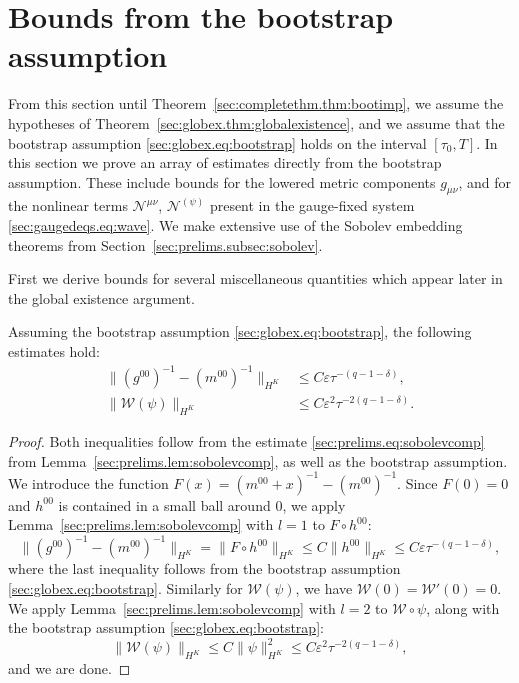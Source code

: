 \documentclass{article}
\newcommand{\mc}{\mathcal}
\newcommand{\ve}{\varepsilon}
\begin{document}
\section{Bounds from the bootstrap assumption}\label{sec:bootbound}
From this section until Theorem~\ref{sec:completethm.thm:bootimp}, we assume the hypotheses of Theorem~\ref{sec:globex.thm:globalexistence}, and we assume that the bootstrap assumption \eqref{sec:globex.eq:bootstrap} holds on the interval $[\tau_0,T]$. In this section we prove an array of estimates directly from the bootstrap assumption. These include bounds for the lowered metric components $g_{\mu\nu}$, and for the nonlinear terms $\mc{N}^{\mu\nu}$, $\mc{N}^{(\psi)}$ present in the gauge-fixed system \eqref{sec:gaugedeqs.eq:wave}. We make extensive use of the Sobolev embedding theorems from Section~\ref{sec:prelims.subsec:sobolev}.

First we derive bounds for several miscellaneous quantities which appear later in the global existence argument.
\begin{lemma}\label{sec:bootbound.lem:miscests}
    Assuming the bootstrap assumption \eqref{sec:globex.eq:bootstrap}, the following estimates hold:
    \begin{align}
        \|(g^{00})^{-1} - (m^{00})^{-1}\|_{H^K} &\leq C\ve\tau^{-(q-1-\delta)},\label{sec:bootbound.eq:miscests1}\\
        \|\mc{W}(\psi)\|_{H^K} &\leq C\ve^2\tau^{-2(q-1-\delta)}.\label{sec:bootbound.eq:miscests2}
    \end{align}
\end{lemma}
\begin{proof}
    Both inequalities follow from the estimate \eqref{sec:prelims.eq:sobolevcomp} from Lemma~\ref{sec:prelims.lem:sobolevcomp}, as well as the bootstrap assumption. We introduce the function $F(x) = (m^{00}+x)^{-1}-(m^{00})^{-1}$. Since $F(0) = 0$ and $h^{00}$ is contained in a small ball around $0$, we apply Lemma~\ref{sec:prelims.lem:sobolevcomp} with $l =1$ to $F \circ h^{00}$:
    \begin{equation}
        \|(g^{00})^{-1} - (m^{00})^{-1}\|_{H^K} = \|F\circ h^{00}\|_{H^K} \leq C\|h^{00}\|_{H^K} \leq C\ve \tau^{-(q-1-\delta)},
    \end{equation}
    where the last inequality follows from the bootstrap assumption \eqref{sec:globex.eq:bootstrap}. Similarly for $\mc{W}(\psi)$, we have $\mc{W}(0) = \mc{W}'(0) = 0$. We apply Lemma~\ref{sec:prelims.lem:sobolevcomp} with $l = 2$ to $\mc{W} \circ \psi$, along with the bootstrap assumption \eqref{sec:globex.eq:bootstrap}:
    \begin{equation}
        \|\mc{W}(\psi)\|_{H^K} \leq C\|\psi\|_{H^K}^2 \leq C\ve^2\tau^{-2(q-1-\delta)},
    \end{equation}
    and we are done.
\end{proof}
\end{document}

